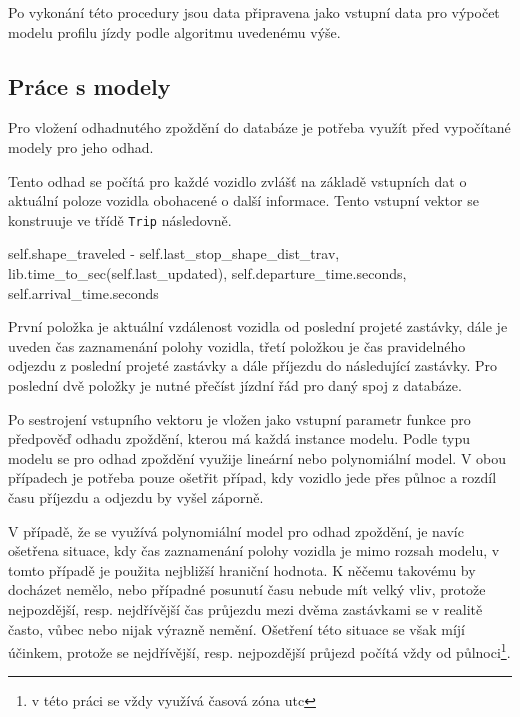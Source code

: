 \bigbreak


Po vykonání této procedury jsou data připravena jako vstupní data pro výpočet modelu profilu jízdy podle algoritmu uvedenému výše.


\subsection{Práce s modely}


Pro vložení odhadnutého zpoždění do databáze je potřeba využít před vypočítané modely pro jeho odhad.


\bigbreak


Tento odhad se počítá pro každé vozidlo zvlášť na základě vstupních dat o aktuální poloze vozidla obohacené o další informace. Tento vstupní vektor se konstruuje ve třídě \verb-Trip- následovně.


\begin{code}[frame=none]
self.shape_traveled - self.last_stop_shape_dist_trav,
lib.time_to_sec(self.last_updated),
self.departure_time.seconds,
self.arrival_time.seconds
\end{code}


\bigbreak


První položka je aktuální vzdálenost vozidla od poslední projeté zastávky, dále je uveden čas zaznamenání polohy vozidla, třetí položkou je čas pravidelného odjezdu z poslední projeté zastávky a dále příjezdu do následující zastávky. Pro poslední dvě položky je nutné přečíst jízdní řád pro daný spoj z databáze.


\bigbreak


Po sestrojení vstupního vektoru je vložen jako vstupní parametr funkce pro předpověď odhadu zpoždění, kterou má každá instance modelu. Podle typu modelu se pro odhad zpoždění využije lineární nebo polynomiální model. V obou případech je potřeba pouze ošetřit případ, kdy vozidlo jede přes půlnoc a rozdíl času příjezdu a odjezdu by vyšel záporně.


\bigbreak


V případě, že se využívá polynomiální model pro odhad zpoždění, je navíc ošetřena situace, kdy čas zaznamenání polohy vozidla je mimo rozsah modelu, v tomto případě je použita nejbližší hraniční hodnota. K něčemu takovému by docházet nemělo, nebo případné posunutí času nebude mít velký vliv, protože nejpozdější, resp. nejdřívější čas průjezdu mezi dvěma zastávkami se v realitě často, vůbec nebo nijak výrazně nemění. Ošetření této situace se však míjí účinkem, protože se nejdřívější, resp. nejpozdější průjezd počítá vždy od půlnoci\footnote{v této práci se vždy využívá časová zóna \gls{utc}}.


